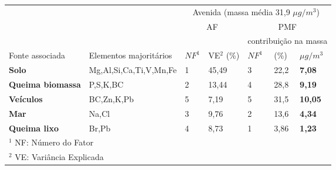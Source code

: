 \begin{tabular}{llll|lll}
\hline
                                                  &                        & \multicolumn{5}{c}{Avenida (massa média 31,9 $\mu g / m^3$)}    \\
                                                  &                        &  \multicolumn{2}{c}{AF}                      & \multicolumn{3}{c}{PMF}          \\
\hline
 & & & & \multicolumn{3}{c}{contribuição na massa} \\
Fonte associada                                   & Elementos majoritários & $NF^1$       & VE$^2$  (\%)            & $NF^1$ & (\%)  & $\mu g / m^3$ \\
\hline
\textbf{Solo}                                     & Mg,Al,Si,Ca,Ti,V,Mn,Fe & 1       & 45,49               & 3 & 22,2        & \textbf{7,08}  \\
\textbf{Queima biomassa}                          & P,S,K,BC                  &  2       & 13,44               & 4 & 28,8        & \textbf{9,19}  \\
\textbf{Veículos}                                 & BC,Zn,K,Pb             &  5       & 7,19                & 5 & 31,5        & \textbf{10,05} \\
\textbf{Mar}                                      & Na,Cl                  &  3       & 9,76                & 2 & 13,6        & \textbf{4,34}  \\
\textbf{Queima lixo} & Br,Pb                      &  4       & 8,73                & 1 & 3,86        & \textbf{1,23} \\

\hline
\multicolumn{7}{l}{$^1$ NF: Número do Fator} \\
\multicolumn{7}{l}{$^2$ VE: Variância Explicada} \\
\hline
\end{tabular}

